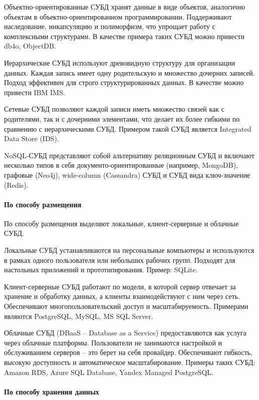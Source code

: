 Объектно-ориентированные СУБД хранят данные в виде объектов, аналогично объектам в объектно-ориентированном программировании. Поддерживают наследование, инкапсуляцию и полиморфизм, что упрощает работу с комплексными структурами. В качестве примера таких СУБД можно привести db4o, ObjectDB.

Иерархические СУБД используют древовидную структуру для организации данных. Каждая запись имеет одну родительскую и множество дочерних записей. Подход эффективен для строго структурированных данных. В качестве можно привести IBM IMS.

Сетевые СУБД позволяют каждой записи иметь множество связей как с родителями, так и с дочерними элементами, что делает их более гибкими по сравнению с иерархическими СУБД. Примером такой СУБД является Integrated Data Store (IDS).

NoSQL-СУБД представляют собой альтернативу реляционным СУБД и включают несколько типов в себя документо-ориентированные (например, MongoDB), графовые (Neo4j), wide-column (Cassandra) СУБД и СУБД вида ключ-значение (Redis).

\paragraph{По способу размещения}

По способу размещения выделяют локальные, клиент-серверные и облачные СУБД.

Локальные СУБД устанавливаются на персональные компьютеры и используются в рамках одного пользователя или небольших рабочих групп. Подходят для настольных приложений и прототипирования. Пример: SQLite.

Клиент-серверные СУБД работают по модели, в которой сервер отвечает за хранение и обработку данных, а клиенты взаимодействуют с ним через сеть. Обеспечивают многопользовательский доступ и масштабируемость. Примерами являются PostgreSQL, MySQL, MS SQL Server.

Облачные СУБД (DBaaS – Database as a Service) предоставляются как услуга через облачные платформы. Пользователи не занимаются настройкой и обслуживанием серверов – это берет на себя провайдер. Обеспечивают гибкость, высокую доступность и автоматическое масштабирование. Примеры таких СУБД: Amazon RDS, Azure SQL Database, Yandex Managed PostgreSQL.

\paragraph{По способу хранения данных}

